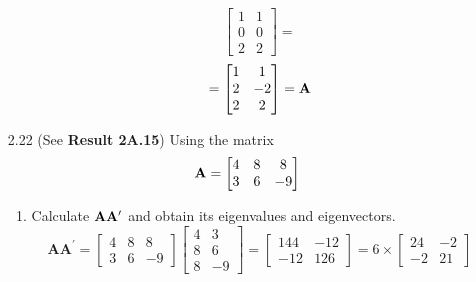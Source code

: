 \begin{enumerate}[font=\bfseries]
\begin{enumerate}
\[\begin{bmatrix}
                    1 & 1 \\
                    0 & 0 \\
                    2 & 2
                \end{bmatrix}
                =
            \]
            \[
                =
                \begin{bmatrix}
                    1 & 1 \\
                    2 & -2 \\
                    2 & 2
                \end{bmatrix}
                =
                \bold{A}
            \]
        \end{enumerate}
        \item[2.22] (See \textbf{Result 2A.15}) Using the matrix
        \[
            \bold{A}
            =
            \begin{bmatrix}
                4 & 8 & 8 \\
                3 & 6 & -9
            \end{bmatrix}
        \]
        \begin{enumerate}
            \item Calculate $\bold{A}\bold{A}^\prime$ and obtain its eigenvalues and eigenvectors.
            \[
                \mathbf{A}\mathbf{A}^\prime
                =
                \begin{bmatrix}
                    4 & 8 & 8\\
                    3 & 6 & -9
                \end{bmatrix}
                \begin{bmatrix}
                    4 & 3 \\
                    8 & 6 \\
                    8 & -9
                \end{bmatrix}
                =
                \begin{bmatrix}
                    144 & -12 \\
                    -12 & 126
                \end{bmatrix}
                =
                6 \times
                \begin{bmatrix}
                    24 & -2 \\
                    -2 & 21
                \end{bmatrix}
\]
\end{enumerate}
\end{enumerate}
